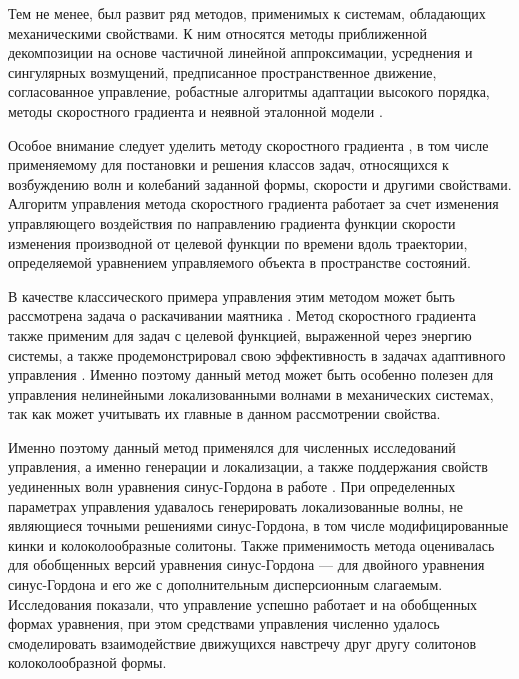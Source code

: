 Тем не менее, был развит ряд методов, применимых к системам, обладающих механическими свойствами. К ним относятся методы приближенной декомпозиции на основе частичной линейной аппроксимации, усреднения и сингулярных возмущений, предписанное пространственное движение, согласованное управление, робастные алгоритмы адаптации высокого порядка, методы скоростного градиента и неявной эталонной модели \cite{intro_miro}.

Особое внимание следует уделить методу скоростного градиента \cite{intro_andr}, в том числе применяемому для постановки и решения классов задач, относящихся к возбуждению волн и колебаний заданной формы, скорости и другими свойствами. Алгоритм управления метода скоростного градиента работает за счет изменения управляющего воздействия по направлению градиента функции скорости изменения производной от целевой функции по времени вдоль траектории, определяемой уравнением управляемого объекта в пространстве состояний. 

В качестве классического примера управления этим методом может быть рассмотрена задача о раскачивании маятника \cite{intro_akulenko}. Метод скоростного градиента также применим для задач с целевой функцией, выраженной через энергию системы, а также продемонстрировал свою эффективность в задачах адаптивного управления \cite{intro_fradkov_scheme, intro_fomin, intro_fradkov_adapt}. Именно поэтому данный метод может быть особенно полезен для управления нелинейными локализованными волнами в механических системах, так как может учитывать их главные в данном рассмотрении свойства.

Именно поэтому данный метод применялся для численных исследований управления, а именно генерации и локализации, а также поддержания свойств уединенных волн уравнения синус-Гордона в работе \cite{porant16}. При определенных параметрах управления удавалось генерировать локализованные волны, не являющиеся точными решениями синус-Гордона, в том числе модифицированные кинки и колоколообразные солитоны. Также применимость метода оценивалась для обобщенных версий уравнения синус-Гордона --- для двойного уравнения синус-Гордона и его же с дополнительным дисперсионным слагаемым. Исследования показали, что управление успешно работает и на обобщенных формах уравнения, при этом средствами управления численно удалось смоделировать взаимодействие движущихся навстречу друг другу солитонов колоколообразной формы.

